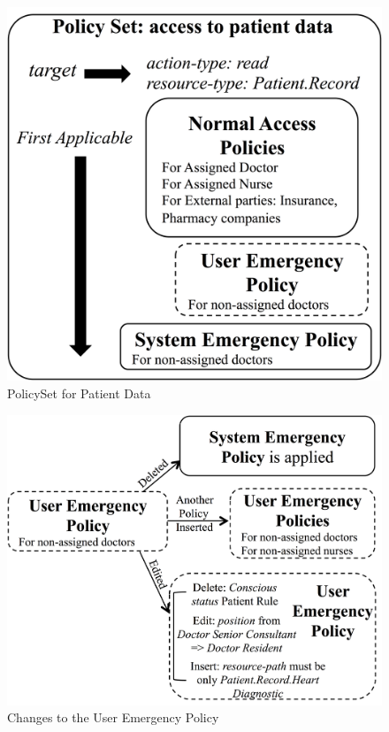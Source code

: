 \documentclass[conference]{IEEEtran}
\begin{document}
\begin{figure}[ht!]
	\label{fig:policyset}
	\centering
	\includegraphics[scale=0.5]{fig/PolicySet.png}
	\caption{PolicySet for Patient Data}
\end{figure}
\begin{figure}[ht!]
	\label{fig:policychanges}
	\centering
	\includegraphics[scale=0.5]{fig/PolicyChange.png}
	\caption{Changes to the User Emergency Policy}
\end{figure}
\end{document}
